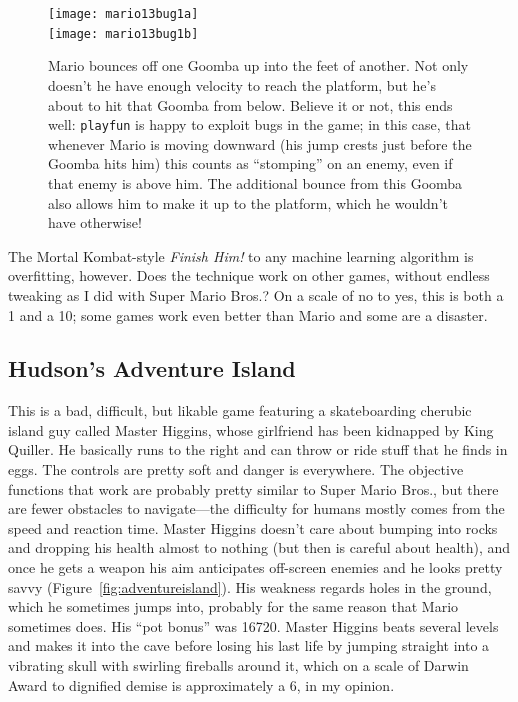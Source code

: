 \documentclass[twocolumn]{article}
\begin{document}
\begin{figure}[h!tb]
\begin{center}
\texttt{[image: mario13bug1a]} \\[0.3em]
\texttt{[image: mario13bug1b]}
\end{center}\vspace{-0.1in}
\caption{Mario bounces off one Goomba up into the feet of another. Not
  only doesn't he have enough velocity to reach the platform, but he's
  about to hit that Goomba from below. Believe it or not, this ends
  well: {\tt playfun} is happy to exploit bugs in the game; in this case,
  that whenever Mario is moving downward (his jump crests just before the
  Goomba hits him) this counts as ``stomping'' on an enemy, even if that
  enemy is above him. The additional bounce from this Goomba also allows
  him to make it up to the platform, which he wouldn't have otherwise!
}
\label{fig:mario13bug1}
\end{figure}

The Mortal Kombat-style {\em Finish Him!} to any machine learning
algorithm is overfitting, however. Does the technique work on other
games, without endless tweaking as I did with Super Mario Bros.? On a
scale of no to yes, this is both a 1 and a 10; some games work even
better than Mario and some are a disaster.

\subsection{Hudson's Adventure Island}

This is a bad, difficult, but likable game featuring a skateboarding
cherubic island guy called Master Higgins, whose girlfriend has been
kidnapped by King Quiller. He basically runs to the right and can
throw or ride stuff that he finds in eggs. The controls are pretty
soft and danger is everywhere. The objective functions that work are
probably pretty similar to Super Mario Bros., but there are fewer
obstacles to navigate---the difficulty for humans mostly comes from
the speed and reaction time. Master Higgins doesn't care about bumping
into rocks and dropping his health almost to nothing (but then is
careful about health), and once he gets a weapon his aim anticipates
off-screen enemies and he looks pretty savvy
(Figure~\ref{fig:adventureisland}). His weakness regards holes in the
ground, which he sometimes jumps into, probably for the same reason
that Mario sometimes does. His ``pot bonus'' was 16720. Master Higgins
beats several levels and makes it into the cave before losing his last
life by jumping straight into a vibrating skull with swirling
fireballs around it, which on a scale of Darwin Award to dignified
demise is approximately a 6, in my opinion.
\end{document}

